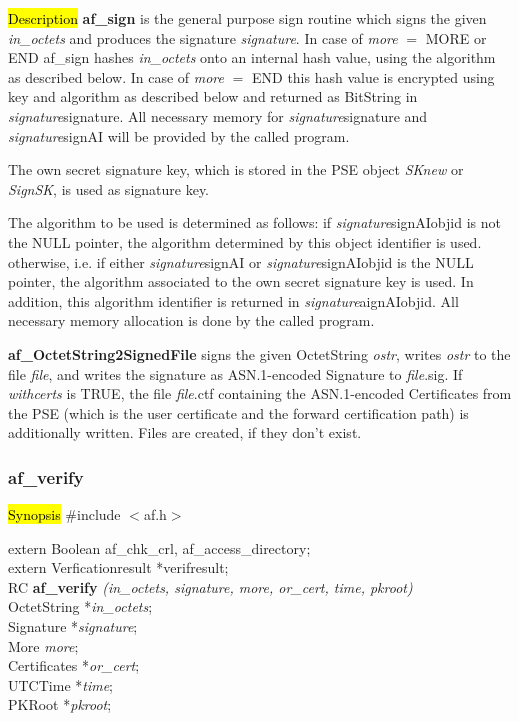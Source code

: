 \hl{Description}
{\bf af\_sign} is the general purpose sign routine which signs the given
{\em in\_octets} and produces the signature {\em signature}.
In case of {\em more} $=$ MORE or END af\_sign hashes {\em in\_octets} onto
an internal hash value, using the algorithm as described below.
In case of {\em more} $=$ END this hash value is encrypted using key and
algorithm as described below and returned as BitString in {\em signature}\pf signature.
All necessary memory for {\em signature}\pf signature and {\em signature}\pf signAI
will be provided by the called program.

The own secret signature key, which is stored in the PSE
object {\em SKnew} or {\em SignSK}, is used as signature key. 

The algorithm to be used is determined as follows:
\be
\m if {\em signature}\pf signAI\pf objid is not the NULL pointer, the algorithm
   determined by this object identifier is used.
\m otherwise, i.e. if either {\em signature}\pf signAI or {\em signature}\pf signAI\pf objid 
   is the NULL pointer, the algorithm
   associated to the own secret signature key is used.
   In addition, this algorithm identifier is returned in {\em signature}\pf aignAI\pf objid.
   All necessary memory allocation is done by the called program.
\ee

{\bf af\_OctetString2SignedFile} signs the given OctetString {\em ostr}, writes {\em ostr}
to the file {\em file}, and writes the signature as ASN.1-encoded Signature to {\em file}.sig.
If {\em withcerts} is TRUE, the file {\em file}.ctf containing the ASN.1-encoded Certificates
from the PSE (which is the user certificate and the forward certification path) is additionally
written. Files are created, if they don't exist.

\subsubsection{af\_verify}
\label{af_verify}
\hl{Synopsis}
\#include $<$af.h$>$ 

extern Boolean af\_chk\_crl, af\_access\_directory; \\
extern Verficationresult *verifresult; \\ [1em]
RC {\bf af\_verify} {\em (in\_octets, signature, more, or\_cert, time, pkroot)} \\
OctetString *{\em in\_octets}; \\
Signature *{\em signature}; \\
More {\em more}; \\
Certificates *{\em or\_cert}; \\
UTCTime *{\em time}; \\
PKRoot *{\em pkroot};

